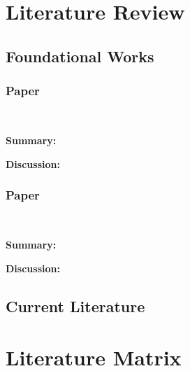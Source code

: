 \documentclass[article]{IEEEtran}
\begin{document}
\section{Literature Review}

\subsection{Foundational Works}

\subsubsection{Paper}
\hfill\\
\par
\textbf{Summary:} 
\par
\textbf{Discussion:}
\subsubsection{Paper}
\hfill\\
\par
\textbf{Summary:} 
\par
\textbf{Discussion:}
\subsection{Current Literature}


\section{Literature Matrix}
\end{document}

